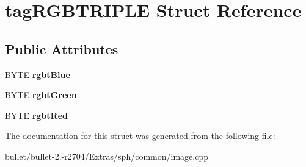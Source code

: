 \hypertarget{structtag_r_g_b_t_r_i_p_l_e}{\section{tag\+R\+G\+B\+T\+R\+I\+P\+L\+E Struct Reference}
\label{structtag_r_g_b_t_r_i_p_l_e}
}
\subsection*{Public Attributes}
\begin{DoxyCompactItemize}
\item 
\hypertarget{structtag_r_g_b_t_r_i_p_l_e_adbebf9e7802cdfffbdae31c08a71dab7}{B\+Y\+T\+E {\bfseries rgbt\+Blue}}\label{structtag_r_g_b_t_r_i_p_l_e_adbebf9e7802cdfffbdae31c08a71dab7}

\item 
\hypertarget{structtag_r_g_b_t_r_i_p_l_e_a2e3e106422819352693de65189cc341f}{B\+Y\+T\+E {\bfseries rgbt\+Green}}\label{structtag_r_g_b_t_r_i_p_l_e_a2e3e106422819352693de65189cc341f}

\item 
\hypertarget{structtag_r_g_b_t_r_i_p_l_e_ae61b0771fd3e1e267a3495dcfba5e21c}{B\+Y\+T\+E {\bfseries rgbt\+Red}}\label{structtag_r_g_b_t_r_i_p_l_e_ae61b0771fd3e1e267a3495dcfba5e21c}

\end{DoxyCompactItemize}


The documentation for this struct was generated from the following file\+:\begin{DoxyCompactItemize}
\item 
bullet/bullet-\/2.-\/r2704/\+Extras/sph/common/image.\+cpp\end{DoxyCompactItemize}
